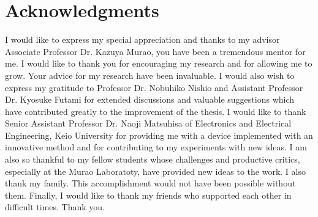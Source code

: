\documentclass[uplatex, 12pt, papersize, openany, dvipdfmx]{jsbook}
\begin{document}
\tableofcontents %
\listoffigures %
\listoftables %

\startMain








\chapter*{Acknowledgments}
I would like to express my special appreciation and thanks to my advisor Associate Professor Dr. Kazuya Murao, you have been a tremendous mentor for me. I would like to thank you for encouraging my research and for allowing me to grow. Your advice for my research have been invaluable. I would also wish to express my gratitude to Professor Dr. Nobuhiko Nishio and Assistant Professor Dr. Kyosuke Futami for extended discussions and valuable suggestions which have contributed greatly to the improvement of the thesis. I would like to thank Senior Assistant Professor Dr. Naoji Matsuhisa of Electronics and Electrical Engineering, Keio University for providing me with a device implemented with an innovative method and for contributing to my experiments with new ideas. I am also so thankful to my fellow students whose challenges and productive critics, especially at the Murao Laboratoty, have provided new ideas to the work. I also thank my family. This accomplishment would not have been possible without them. Finally, I would like to thank my friends who supported each other in difficult times. Thank you.



\end{document}
